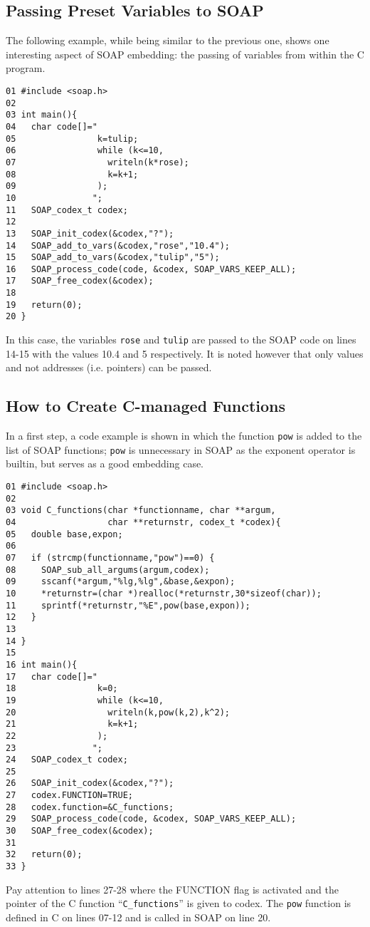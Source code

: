 \documentclass{warpdoc}
\begin{document}
\subsection{Passing Preset Variables to SOAP}

The following example, while being similar to the previous one, shows
one interesting aspect of SOAP embedding: the passing of variables from
within the C program.
%
\begin{verbatim}
01 #include <soap.h>
02
03 int main(){
04   char code[]="
05                k=tulip;
06                while (k<=10,
07                  writeln(k*rose);
08                  k=k+1;
09                );
10               ";
11   SOAP_codex_t codex;
12
13   SOAP_init_codex(&codex,"?");
14   SOAP_add_to_vars(&codex,"rose","10.4");
15   SOAP_add_to_vars(&codex,"tulip","5");
16   SOAP_process_code(code, &codex, SOAP_VARS_KEEP_ALL);
17   SOAP_free_codex(&codex);
18
19   return(0);
20 }
\end{verbatim}
%
In this case, the variables \verb|rose| and
\verb|tulip| are passed to the SOAP code on lines 14-15 with the values 10.4 and 5
respectively. It is noted however that only values and not addresses
(i.e. pointers) can be passed.





\subsection{How to Create C-managed Functions}

In a first step, a code example is shown in which the function
\verb|pow| is added to the list of SOAP functions; \verb|pow| is unnecessary
in SOAP as the exponent operator is builtin, but serves as a good embedding case.
%
\begin{verbatim}
01 #include <soap.h>
02
03 void C_functions(char *functionname, char **argum,
04                  char **returnstr, codex_t *codex){
05   double base,expon;
06
07   if (strcmp(functionname,"pow")==0) {
08     SOAP_sub_all_argums(argum,codex);
09     sscanf(*argum,"%lg,%lg",&base,&expon);
10     *returnstr=(char *)realloc(*returnstr,30*sizeof(char));
11     sprintf(*returnstr,"%E",pow(base,expon));
12   }
13
14 }
15
16 int main(){
17   char code[]="
18                k=0;
19                while (k<=10,
20                  writeln(k,pow(k,2),k^2);
21                  k=k+1;
22                );
23               ";
24   SOAP_codex_t codex;
25
26   SOAP_init_codex(&codex,"?");
27   codex.FUNCTION=TRUE;
28   codex.function=&C_functions;
29   SOAP_process_code(code, &codex, SOAP_VARS_KEEP_ALL);
30   SOAP_free_codex(&codex);
31
32   return(0);
33 }
\end{verbatim}
%
Pay attention to lines 27-28 where the FUNCTION flag is activated and the pointer
of the C function ``\verb|C_functions|'' is given to codex. The \verb|pow|
function is defined in C on lines 07-12 and is called in SOAP on line
20.
\end{document}

